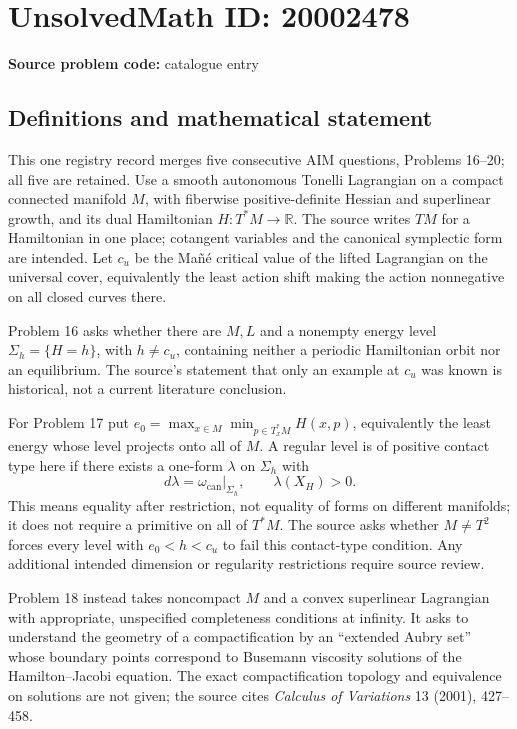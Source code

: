 \documentclass[11pt]{article}
\newcommand{\R}{\mathbb{R}}
\begin{document}
\section*{UnsolvedMath ID: 20002478}
\textbf{Source problem code:} catalogue entry
\subsection{Definitions and mathematical statement}
This one registry record merges five consecutive AIM questions, Problems 16--20; all five are retained. Use a smooth autonomous Tonelli Lagrangian on a compact connected manifold \(M\), with fiberwise positive-definite Hessian and superlinear growth, and its dual Hamiltonian \(H:T^*M\to\R\). The source writes \(TM\) for a Hamiltonian in one place; cotangent variables and the canonical symplectic form are intended. Let \(c_u\) be the Ma\~n\'e critical value of the lifted Lagrangian on the universal cover, equivalently the least action shift making the action nonnegative on all closed curves there.

Problem 16 asks whether there are \(M,L\) and a nonempty energy level \(\Sigma_h=\{H=h\}\), with \(h\ne c_u\), containing neither a periodic Hamiltonian orbit nor an equilibrium. The source's statement that only an example at \(c_u\) was known is historical, not a current literature conclusion.

For Problem 17 put \(e_0=\max_{x\in M}\min_{p\in T_x^*M}H(x,p)\), equivalently the least energy whose level projects onto all of \(M\). A regular level is of positive contact type here if there exists a one-form \(\lambda\) on \(\Sigma_h\) with
\[
 d\lambda=\omega_{\mathrm{can}}|_{\Sigma_h},\qquad\lambda(X_H)>0.
\]
This means equality after restriction, not equality of forms on different manifolds; it does not require a primitive on all of \(T^*M\). The source asks whether \(M\ne T^2\) forces every level with \(e_0<h<c_u\) to fail this contact-type condition. Any additional intended dimension or regularity restrictions require source review.

Problem 18 instead takes noncompact \(M\) and a convex superlinear Lagrangian with appropriate, unspecified completeness conditions at infinity. It asks to understand the geometry of a compactification by an ``extended Aubry set'' whose boundary points correspond to Busemann viscosity solutions of the Hamilton--Jacobi equation. The exact compactification topology and equivalence on solutions are not given; the source cites \emph{Calculus of Variations} 13 (2001), 427--458.
\end{document}
